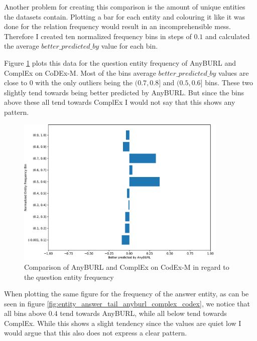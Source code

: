 Another problem for creating this comparison is the amount of unique entities the datasets contain. Plotting a bar for each entity and colouring it like it was done for the relation frequency would result in an incomprehensible mess. Therefore I created ten normalized frequency bins in steps of $0.1$ and calculated the average $better\_predicted\_by$ value for each bin. 

Figure \ref{fig:entity_question_tail_anyburl_complex_codex} plots this data for the question entity frequency of AnyBURL and ComplEx on CoDEx-M. Most of the bins average $better\_predicted\_by$ values are close to $0$ with the only outliers being the $(0.7, 0.8]$ and $(0.5, 0.6]$ bins. These two slightly tend towards being better predicted by AnyBURL. But since the bins above these all tend towards ComplEx I would not say that this shows any pattern.

\begin{figure}[H]
\centering
\includegraphics[width=0.9\textwidth]{images/entity_freq_question_anyburl_complex_codex.PNG}
\caption{Comparison of AnyBURL and ComplEx on CodEx-M in regard to the question entity frequency}
\label{fig:entity_question_tail_anyburl_complex_codex}
\end{figure}

When plotting the same figure for the frequency of the answer entity, as can be seen in figure \ref{fig:entity_answer_tail_anyburl_complex_codex}, we notice that all bins above $0.4$ tend towards AnyBURL, while all below tend towards ComplEx. While this shows a slight tendency since the values are quiet low I would argue that this also does not express a clear pattern. 

